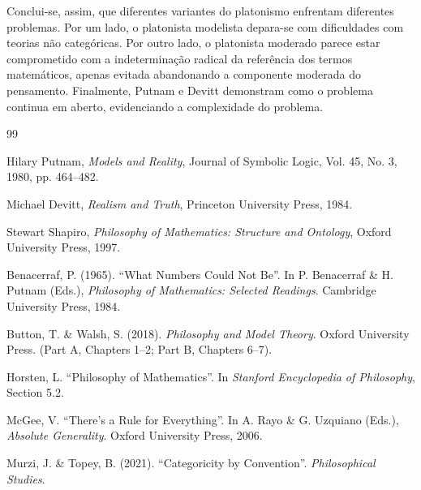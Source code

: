 \documentclass{article}
\begin{document}
Conclui-se, assim, que diferentes variantes do platonismo enfrentam diferentes problemas. Por um lado, o platonista modelista depara-se com dificuldades com teorias não categóricas. Por outro lado, o platonista moderado parece estar comprometido com a indeterminação radical da referência dos termos matemáticos, apenas evitada abandonando a componente moderada do pensamento. Finalmente, Putnam e Devitt demonstram como o problema continua em aberto, evidenciando a complexidade do problema.


\newpage

\begin{thebibliography}{99}

Hilary Putnam,
\textit{Models and Reality},
Journal of Symbolic Logic, Vol. 45, No. 3, 1980, pp. 464--482.

Michael Devitt,
\textit{Realism and Truth},
Princeton University Press, 1984.

Stewart Shapiro,
\textit{Philosophy of Mathematics: Structure and Ontology},
Oxford University Press, 1997.

Benacerraf, P. (1965).
``What Numbers Could Not Be''.
In P. Benacerraf \& H. Putnam (Eds.),
\textit{Philosophy of Mathematics: Selected Readings}.
Cambridge University Press, 1984.

Button, T. \& Walsh, S. (2018).
\textit{Philosophy and Model Theory}.
Oxford University Press.
(Part A, Chapters 1--2; Part B, Chapters 6--7).

Horsten, L.
``Philosophy of Mathematics''.
In \textit{Stanford Encyclopedia of Philosophy},
Section 5.2.

McGee, V.
``There's a Rule for Everything''.
In A. Rayo \& G. Uzquiano (Eds.),
\textit{Absolute Generality}.
Oxford University Press, 2006.

Murzi, J. \& Topey, B. (2021).
``Categoricity by Convention''.
\textit{Philosophical Studies}.

\end{thebibliography}
\end{document}

